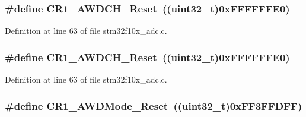 \subsubsection[{\texorpdfstring{C\+R1\+\_\+\+A\+W\+D\+C\+H\+\_\+\+Reset}{CR1_AWDCH_Reset}}]{\setlength{\rightskip}{0pt plus 5cm}\#define C\+R1\+\_\+\+A\+W\+D\+C\+H\+\_\+\+Reset~(({\bf uint32\+\_\+t})0x\+F\+F\+F\+F\+F\+F\+E0)}\hypertarget{group___a_d_c___private___defines_gabe7e68383d281e58707a1cd749a3374e}{}\label{group___a_d_c___private___defines_gabe7e68383d281e58707a1cd749a3374e}


Definition at line 63 of file stm32f10x\+\_\+adc.\+c.

\subsubsection[{\texorpdfstring{C\+R1\+\_\+\+A\+W\+D\+C\+H\+\_\+\+Reset}{CR1_AWDCH_Reset}}]{\setlength{\rightskip}{0pt plus 5cm}\#define C\+R1\+\_\+\+A\+W\+D\+C\+H\+\_\+\+Reset~(({\bf uint32\+\_\+t})0x\+F\+F\+F\+F\+F\+F\+E0)}\hypertarget{group___a_d_c___private___defines_gabe7e68383d281e58707a1cd749a3374e}{}\label{group___a_d_c___private___defines_gabe7e68383d281e58707a1cd749a3374e}


Definition at line 63 of file stm32f10x\+\_\+adc.\+c.

\subsubsection[{\texorpdfstring{C\+R1\+\_\+\+A\+W\+D\+Mode\+\_\+\+Reset}{CR1_AWDMode_Reset}}]{\setlength{\rightskip}{0pt plus 5cm}\#define C\+R1\+\_\+\+A\+W\+D\+Mode\+\_\+\+Reset~(({\bf uint32\+\_\+t})0x\+F\+F3\+F\+F\+D\+F\+F)}\hypertarget{group___a_d_c___private___defines_gae53703f0c718ecc5b3e1a69c60af3697}{}\label{group___a_d_c___private___defines_gae53703f0c718ecc5b3e1a69c60af3697}


